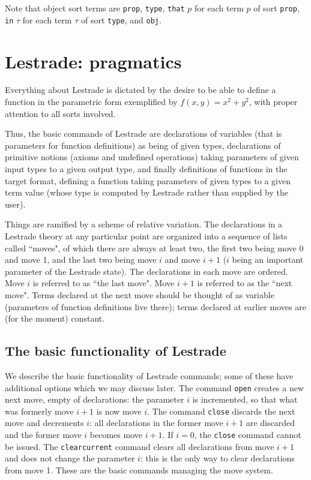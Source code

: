 \documentclass{article}
\begin{document}
Note that object sort terms are {\tt prop}, {\tt type}, {\tt that} $p$ for each term $p$ of sort {\tt prop}, {\tt in} $\tau$ for each term $\tau$ of sort
{\tt type}, and {\tt obj}.

\newpage


\section{Lestrade:  pragmatics}

Everything about Lestrade is dictated by the desire to be able to define a function in the parametric form exemplified by $f(x,y)=x^2+y^2$, with proper attention to all sorts involved.

Thus, the basic commands of Lestrade are declarations of variables (that is parameters for function definitions) as being of given types, declarations of
primitive notions (axioms and undefined operations) taking parameters of given input types to a given output type, and finally definitions of functions in the target format, defining a function taking parameters of given types to a given term value (whose type is computed by Lestrade rather than supplied by the user).

Things are ramified by a scheme of relative variation.  The declarations in a Lestrade theory at any particular point are organized into a sequence of lists
called ``moves", of which there are always at least two, the first two being move 0 and move 1, and the last two being move $i$ and move $i+1$ ($i$ being an important parameter of the Lestrade state).  The declarations in each move are ordered.  Move $i$ is referred to as ``the last move".  Move $i+1$ is referred to as the ``next move".  Terms declared at the next move should be thought of as variable (parameters of function definitions live there);  terms declared at earlier moves are (for the moment) constant.

\subsection{The basic functionality of Lestrade}

We describe the basic functionality of Lestrade commands;  some of these have additional options which we may discuss later.  The command {\tt open}
creates a new next move, empty of declarations:  the parameter $i$ is incremented, so that what was formerly move $i+1$ is now move $i$.  The command
{\tt close} discards the next move and decrements $i$:  all declarations in the former move $i+1$ are discarded and the former move $i$ becomes move $i+1$.  If $i=0$, the {\tt close} command cannot be issued.  The {\tt clearcurrent} command clears all declarations from move $i+1$ and does not change the parameter $i$:  this is the only way to clear declarations from move 1.  These are the basic commands managing the move system.
\end{document}
